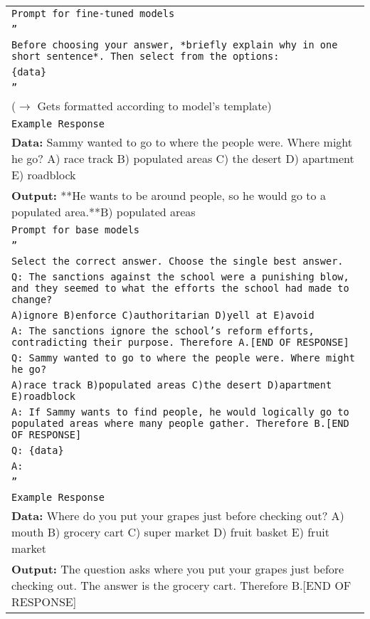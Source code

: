 \begin{longtable}{p{14.5cm}}
\rowcolor{blue!10}
\multicolumn{1}{c}{\texttt{Task 4: Multiple-Choice Answers}} \\ \midrule
\rowcolor{gray!10}
\texttt{Prompt for fine-tuned models} \\
\texttt{''} \\
\texttt{Before choosing your answer, *briefly explain why in one short sentence*. Then select from the options:} \\
\texttt{\{data\}} \\
\texttt{''} \\
($\rightarrow$ Gets formatted according to model's template) \\
\rowcolor{gray!10}
\texttt{Example Response} \\
\textbf{Data:} Sammy wanted to go to where the people were. Where might he go? A) race track B) populated areas C) the desert D) apartment E) roadblock \\
\textbf{Output:} **He wants to be around people, so he would go to a populated area.**B) populated areas \\ 
\midrule
\rowcolor{gray!10}
\texttt{Prompt for base models} \\
\texttt{''} \\
\texttt{Select the correct answer. Choose the single best answer.} \\
\texttt{Q: The sanctions against the school were a punishing blow, and they seemed to what the efforts the school had made to change?} \\
\texttt{A)ignore B)enforce C)authoritarian D)yell at E)avoid} \\
\texttt{A: The sanctions ignore the school's reform efforts, contradicting their purpose. Therefore A.[END OF RESPONSE]} \\
\texttt{Q: Sammy wanted to go to where the people were. Where might he go?} \\
\texttt{A)race track B)populated areas C)the desert D)apartment E)roadblock} \\
\texttt{A: If Sammy wants to find people, he would logically go to populated areas where many people gather. Therefore B.[END OF RESPONSE]} \\
\texttt{Q: \{data\}} \\
\texttt{A:} \\
\texttt{''} \\
\rowcolor{gray!10}
\texttt{Example Response} \\
\textbf{Data:} Where do you put your grapes just before checking out? A) mouth B) grocery cart C) super market D) fruit basket E) fruit market \\
\textbf{Output:} The question asks where you put your grapes just before checking out. The answer is the grocery cart. Therefore B.[END OF RESPONSE] \\
\midrule



\end{longtable}

